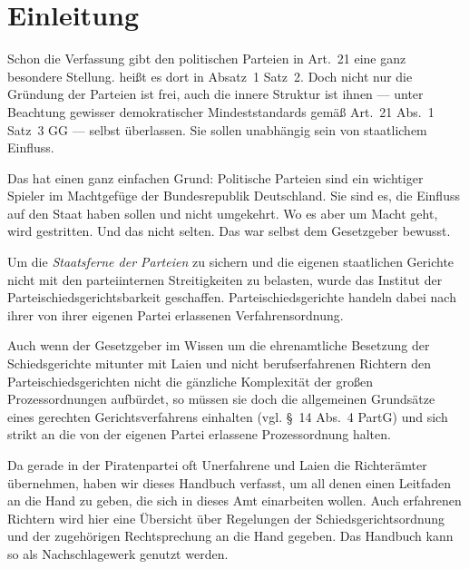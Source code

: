
\chapter{Einleitung}
Schon die Verfassung gibt den politischen Parteien in Art.~21 eine ganz besondere Stellung.
 heißt es dort in Absatz~1 Satz~2.
Doch nicht nur die Gründung der Parteien ist frei, auch die innere Struktur ist ihnen --- unter Beachtung gewisser demokratischer Mindeststandards gemäß Art.~21 Abs.~1 Satz~3 GG --- selbst überlassen.
Sie sollen unabhängig sein von staatlichem Einfluss.

Das hat einen ganz einfachen Grund: Politische Parteien sind ein wichtiger Spieler im Machtgefüge der Bundesrepublik Deutschland.
Sie sind es, die Einfluss auf den Staat haben sollen und nicht umgekehrt.
Wo es aber um Macht geht, wird gestritten.
Und das nicht selten.
Das war selbst dem Gesetzgeber bewusst.

Um die \emph{Staatsferne der Parteien} zu sichern und die eigenen staatlichen Gerichte nicht mit den parteiinternen Streitigkeiten zu belasten, wurde das Institut der Parteischiedsgerichtsbarkeit geschaffen.
Parteischiedsgerichte handeln dabei nach ihrer von ihrer eigenen Partei erlassenen Verfahrensordnung.

Auch wenn der Gesetzgeber im Wissen um die ehrenamtliche Besetzung der Schiedsgerichte mitunter mit Laien und nicht berufserfahrenen Richtern den Parteischiedsgerichten nicht die gänzliche Komplexität der großen Prozessordnungen aufbürdet, so müssen sie doch die allgemeinen Grundsätze eines gerechten Gerichtsverfahrens einhalten (vgl. \S~14 Abs.~4 PartG) und sich strikt an die von der eigenen Partei erlassene Prozessordnung halten.

Da gerade in der Piratenpartei oft Unerfahrene und Laien die Richterämter übernehmen, haben wir dieses Handbuch verfasst, um all denen einen Leitfaden an die Hand zu geben, die sich in dieses Amt einarbeiten wollen.
Auch erfahrenen Richtern wird hier eine Übersicht über Regelungen der Schiedsgerichtsordnung und der zugehörigen Rechtsprechung an die Hand gegeben.
Das Handbuch kann so als Nachschlagewerk genutzt werden.

